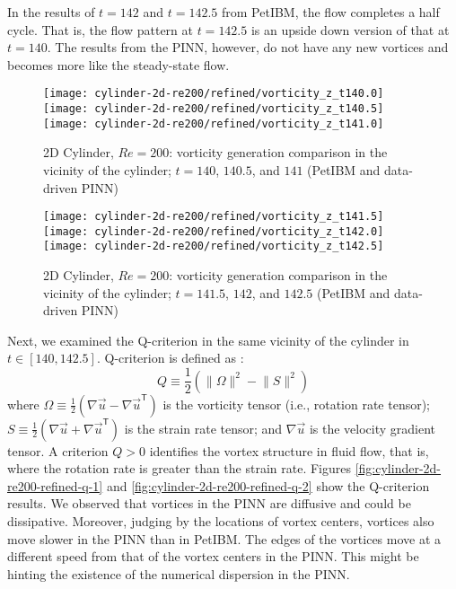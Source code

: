 In the results of $t=142$ and $t=142.5$ from PetIBM, the flow completes a half cycle.
That is, the flow pattern at $t=142.5$ is an upside down version of that at $t=140$.
The results from the PINN, however, do not have any new vortices and becomes more like the steady-state flow. 

\begin{figure}[hbt!]
    \centering
    \texttt{[image: cylinder-2d-re200/refined/vorticity\_z\_t140.0]}
    \newline
    \texttt{[image: cylinder-2d-re200/refined/vorticity\_z\_t140.5]}
    \newline
    \texttt{[image: cylinder-2d-re200/refined/vorticity\_z\_t141.0]}
    \caption{2D Cylinder, $Re=200$: vorticity generation comparison in the vicinity of the cylinder; $t=140$, $140.5$, and $141$ (PetIBM and data-driven PINN)}
    \label{fig:cylinder-2d-re200-refined-vort-1}
\end{figure}

\begin{figure}[hbt!]
    \centering
    \texttt{[image: cylinder-2d-re200/refined/vorticity\_z\_t141.5]}
    \newline
    \texttt{[image: cylinder-2d-re200/refined/vorticity\_z\_t142.0]}
    \newline
    \texttt{[image: cylinder-2d-re200/refined/vorticity\_z\_t142.5]}
    \caption{2D Cylinder, $Re=200$: vorticity generation comparison in the vicinity of the cylinder; $t=141.5$, $142$, and $142.5$ (PetIBM and data-driven PINN)}
    \label{fig:cylinder-2d-re200-refined-vort-2}
\end{figure}

Next, we examined the Q-criterion in the same vicinity of the cylinder in $t\in[140, 142.5]$.
Q-criterion is defined as \cite{jeong_identification_1995}:
\begin{equation}
    Q \equiv \frac{1}{2}\left(\lVert \Omega \rVert^2 - \lVert S \rVert^2\right)
\end{equation}
where $\Omega\equiv\frac{1}{2}\left(\nabla\vec{u}-\nabla\vec{u}^\mathsf{T}\right)$ is the vorticity tensor (i.e., rotation rate tensor); $S\equiv\frac{1}{2}\left(\nabla\vec{u}+\nabla\vec{u}^\mathsf{T}\right)$ is the strain rate tensor; and $\nabla\vec{u}$ is the velocity gradient tensor.
A criterion $Q > 0$ identifies the vortex structure in fluid flow, that is, where the rotation rate is greater than the strain rate.
Figures \ref{fig:cylinder-2d-re200-refined-q-1} and \ref{fig:cylinder-2d-re200-refined-q-2} show the Q-criterion results.
We observed that vortices in the PINN are diffusive and could be dissipative.
Moreover, judging by the locations of vortex centers, vortices also move slower in the PINN than in PetIBM.
The edges of the vortices move at a different speed from that of the vortex centers in the PINN.
This might be hinting the existence of the numerical dispersion in the PINN.

